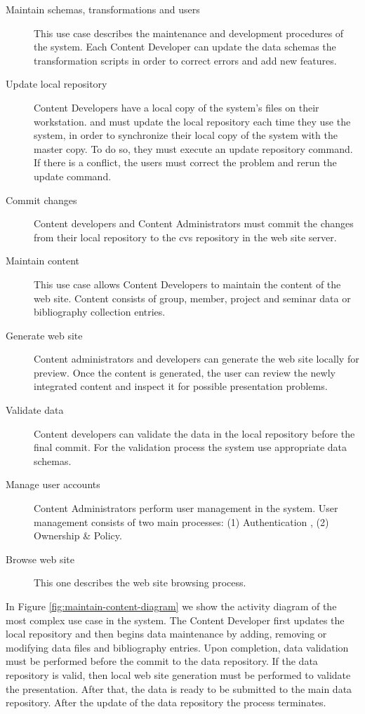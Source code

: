 \documentclass[10pt]{article}
\begin{document}
\begin{description}
\item[Maintain schemas, transformations and users] This use case describes the 
maintenance and development procedures of the system. Each Content Developer can
update the data schemas the transformation scripts in order to correct errors 
and add new features.

\item[Update local repository] Content Developers have a local copy of the system's files on their workstation. 
and must update the local repository each time they use the system, in order to synchronize their local copy of the system with the master copy. 
To do so, they must execute an update 
repository command. If there is a conflict, the users must correct the problem 
and rerun the update command.

\item[Commit changes] Content developers and Content Administrators must commit 
the changes from their local repository to the {\sc cvs} repository in the web site server.

\item[Maintain content] This use case allows Content 
Developers to maintain the content of the web site. 
Content consists of group, member, project and seminar data or bibliography 
collection entries.

\item[Generate web site] Content administrators and developers can generate the 
web site locally for preview. Once the content is generated, 
the user can review the newly integrated content and inspect it
for possible presentation problems.

\item[Validate data] Content developers can validate the data in the local 
repository before the final commit. For the validation process
the system use appropriate data schemas.

\item[Manage user accounts] Content Administrators perform user management in the 
system. User management consists of two main processes: 
(1) Authentication , (2) Ownership \& Policy.

\item[Browse web site] This one describes the web site browsing process.

\end{description} 

In Figure \ref{fig:maintain-content-diagram} we show the activity diagram of the 
most complex use case in the system. The Content Developer first updates the 
local repository and then begins data maintenance by adding, 
removing or modifying data files and bibliography entries. Upon completion, data 
validation must be performed before the commit to the data repository. If the data 
repository is valid, then local web site generation must be performed to validate the 
presentation. After that, the data is ready to be submitted to the main 
data repository. After the update of the data repository the process terminates.
\end{document}
